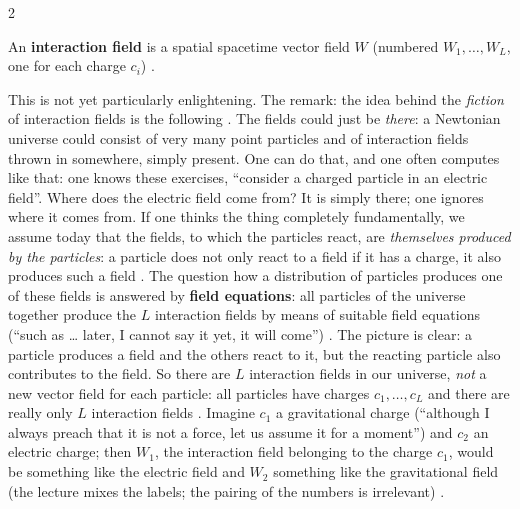 \begin{paracol}{2}
\begin{definition}\label{def:nd-field}
An \textbf{interaction field} is a spatial spacetime vector field $W$ (numbered $W_1,\dots,W_L$, one for each charge $c_i$) .
\end{definition}
This is not yet particularly enlightening. The remark: the idea behind the \emph{fiction} of interaction fields is the following . The fields could just be \emph{there}: a Newtonian universe could consist of very many point particles and of interaction fields thrown in somewhere, simply
present. One can do that, and one often computes like that: one knows these exercises, ``consider a charged particle in an electric field''. Where does the electric field come from? It is simply there; one ignores where it comes from. If one thinks the thing completely fundamentally,
we assume today that the fields, to which the particles react, are \emph{themselves produced by the particles}: a particle does not only react to a field if it has a charge, it also produces such a field . The question how a distribution of particles produces one of these fields
is answered by \textbf{field equations}: all particles of the universe together produce the $L$ interaction fields by means of suitable field equations (``such as \dots{} later, I cannot say it yet, it will come'') . The picture is clear: a particle produces a field and
the others react to it, but the reacting particle also contributes to the field. So there are $L$ interaction fields in our universe, \emph{not} a new vector field for each particle: all particles have charges $c_1,\dots,c_L$ and there are really only $L$ interaction fields .
Imagine $c_1$ a gravitational charge (``although I always preach that it is not a force, let us assume it for a moment'') and $c_2$ an electric charge; then $W_1$, the interaction field belonging to the charge $c_1$, would be something like the electric field and $W_2$ something like the
gravitational field (the lecture mixes the labels; the pairing of the numbers is irrelevant) .


\end{paracol}
